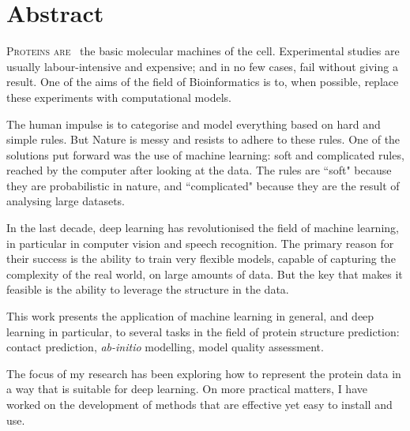 \chapter*{Abstract}
\lettrine[lines=3, lhang=0.25, nindent=0em, findent=2pt]{\color{Maroon}P}{roteins are\ }
the basic molecular machines of the cell.
Experimental studies are usually labour-intensive and expensive; and in no few cases, fail without giving a result.
One of the aims of the field of Bioinformatics is to, when possible, replace these experiments with computational models.

The human impulse is to categorise and model everything based on hard and simple rules.
But Nature is messy and resists to adhere to these rules.
One of the solutions put forward was the use of machine learning: soft and complicated rules, reached by the computer after looking at the data.
The rules are ``soft" because they are probabilistic in nature, and ``complicated" because they are the result of analysing large datasets.

In the last decade, deep learning has revolutionised the field of machine learning, in particular in computer vision and speech recognition.
The primary reason for their success is the ability to train very flexible models, capable of capturing the complexity of the real world, on large amounts of data.
But the key that makes it feasible is the ability to leverage the structure in the data. 

This work presents the application of machine learning in general, and deep learning in particular, to several tasks in the field of protein structure prediction: contact prediction, \emph{ab-initio} modelling, model quality assessment.

The focus of my research has been exploring how to represent the protein data in a way that is suitable for deep learning.
On more practical matters, I have worked on the development of methods that are effective yet easy to install and use.
